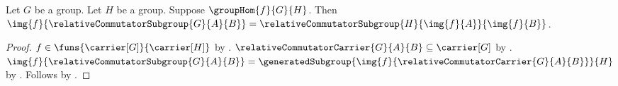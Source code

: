 \begin{theorem}\label{group_hom_image_relative_commutator_subgroup}
    Let $G$ be a group.
    Let $H$ be a group.
    Suppose $\groupHom{f}{G}{H}$.
    Then
        $\img{f}{\relativeCommutatorSubgroup{G}{A}{B}}=
            \relativeCommutatorSubgroup{H}{\img{f}{A}}{\img{f}{B}}$.
\end{theorem}
\begin{proof}
    $f\in\funs{\carrier[G]}{\carrier[H]}$ by
        .
    $\relativeCommutatorCarrier{G}{A}{B}\subseteq\carrier[G]$ by
        .
    $\img{f}{\relativeCommutatorSubgroup{G}{A}{B}}=
        \generatedSubgroup{
            \img{f}{\relativeCommutatorCarrier{G}{A}{B}}}{H}$ by
        .
    Follows by
        .
\end{proof}

